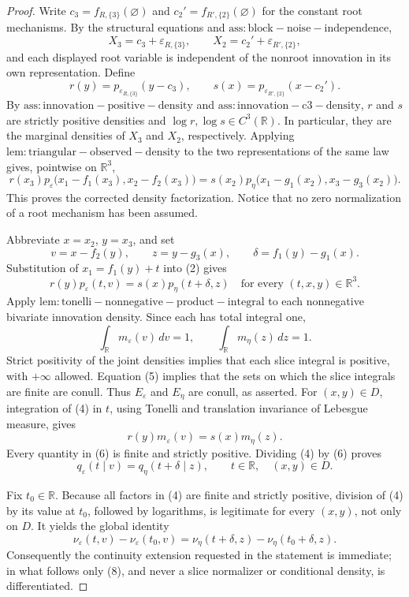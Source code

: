 \documentclass{article}
\begin{document}
\begin{proof}
Write \(c_3=f_{R,\{3\}}(\varnothing)\) and \(c_2'=f_{R',\{2\}}(\varnothing)\) for the constant root mechanisms.  By the structural equations and \(\mathrm{ass:block-noise-independence}\),
\[
 X_3=c_3+\varepsilon_{R,\{3\}},\qquad
 X_2=c_2'+\varepsilon_{R',\{2\}},
\]
and each displayed root variable is independent of the nonroot innovation in its own representation.  Define
\[
 r(y)=p_{\varepsilon_{R,\{3\}}}(y-c_3),
 \qquad
 s(x)=p_{\varepsilon_{R',\{2\}}}(x-c_2').
\tag{1}
\]
By \(\mathrm{ass:innovation-positive-density}\) and \(\mathrm{ass:innovation-c3-density}\), \(r\) and \(s\) are strictly positive densities and \(\log r,\log s\in C^3(\mathbb R)\).  In particular, they are the marginal densities of \(X_3\) and \(X_2\), respectively.  Applying \(\mathrm{lem:triangular-observed-density}\) to the two representations of the same law gives, pointwise on \(\mathbb R^3\),
\[
 r(x_3)p_\varepsilon\bigl(x_1-f_1(x_3),x_2-f_2(x_3)\bigr)
 =s(x_2)p_\eta\bigl(x_1-g_1(x_2),x_3-g_3(x_2)\bigr).
\tag{2}
\]
This proves the corrected density factorization.  Notice that no zero normalization of a root mechanism has been assumed.

Abbreviate \(x=x_2\), \(y=x_3\), and set
\[
 v=x-f_2(y),\qquad z=y-g_3(x),
 \qquad \delta=f_1(y)-g_1(x).
\tag{3}
\]
Substitution of \(x_1=f_1(y)+t\) into (2) gives
\[
 r(y)p_\varepsilon(t,v)=s(x)p_\eta(t+\delta,z)
 \quad\text{for every }(t,x,y)\in\mathbb R^3.
\tag{4}
\]
Apply \(\mathrm{lem:tonelli-nonnegative-product-integral}\) to each nonnegative bivariate innovation density.  Since each has total integral one,
\[
 \int_{\mathbb R}m_\varepsilon(v)\,dv=1,
 \qquad
 \int_{\mathbb R}m_\eta(z)\,dz=1.
\tag{5}
\]
Strict positivity of the joint densities implies that each slice integral is positive, with \(+\infty\) allowed.  Equation (5) implies that the sets on which the slice integrals are finite are conull.  Thus \(E_\varepsilon\) and \(E_\eta\) are conull, as asserted.  For \((x,y)\in D\), integration of (4) in \(t\), using Tonelli and translation invariance of Lebesgue measure, gives
\[
 r(y)m_\varepsilon(v)=s(x)m_\eta(z).
\tag{6}
\]
Every quantity in (6) is finite and strictly positive.  Dividing (4) by (6) proves
\[
 q_\varepsilon(t\mid v)=q_\eta(t+\delta\mid z),
 \qquad t\in\mathbb R,\quad (x,y)\in D.
\tag{7}
\]

Fix \(t_0\in\mathbb R\).  Because all factors in (4) are finite and strictly positive, division of (4) by its value at \(t_0\), followed by logarithms, is legitimate for every \((x,y)\), not only on \(D\).  It yields the global identity
\[
 \nu_\varepsilon(t,v)-\nu_\varepsilon(t_0,v)
 =\nu_\eta(t+\delta,z)-\nu_\eta(t_0+\delta,z).
\tag{8}
\]
Consequently the continuity extension requested in the statement is immediate; in what follows only (8), and never a slice normalizer or conditional density, is differentiated.


\end{proof}
\end{document}
